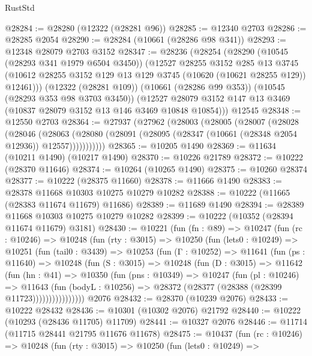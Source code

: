 \begin{lexlean}{RustStd}
\begin{coremodule}
@28284 := @28280 (@12322 (@28281 @96))
@28285 := @12340 @2703
@28286 := @28285 @2054
@28290 := @28284 (@10661 (@28286 @98 @341))
@28293 := @12348 @28079 @2703 @3152
@28347 := @28236
    (@28254
      (@28290
        (@10545 (@28293 @341 @1979 @6504 @3450))
        (@12527
          @28255
          @3152
          @285
          @13
          @3745
          (@10612 @28255 @3152 @129 @13 @129 @3745 (@10620 (@10621 @28255 @129)) @12461)))
      (@12322 (@28281 @109))
      (@10661 (@28286 @99 @353))
      (@10545 (@28293 @353 @98 @3703 @3450))
      (@12527 @28079 @3152 @147 @13 @3469 (@10837 @28079 @3152 @13 @146 @3469 @10848 @10854)))
    @12545
@28348 := @12550 @2703
@28364 := @27937
    (@27962
      (@28003
        (@28005
          (@28007
            (@28028
              (@28046
                (@28063
                  (@28080 (@28091 (@28095 (@28347 (@10661 (@28348 @2054 @12936)) @12557)))))))))))
@28365 := @10205 @1490
@28369 := @11634 (@10211 @1490) (@10217 @1490)
@28370 := @10226 @21789
@28372 := @10222 (@28370 @11646)
@28374 := @10264 (@10265 @1490)
@28375 := @10260 @28374
@28377 := @10222 (@28375 @11660)
@28378 := @11666 @1490
@28383 := @28378 @11668 @10303 @10275 @10279 @10282
@28388 := @10222 (@11665 (@28383 @11674 @11679) @11686)
@28389 := @11689 @1490
@28394 := @28389 @11668 @10303 @10275 @10279 @10282
@28399 := @10222 (@10352 (@28394 @11674 @11679) @3181)
@28430 := @10221
    (fun (fn : @89) =>
    @10247
      (fun (rc : @10246) =>
      @10248
        (fun (rty : @3015) =>
        @10250
          (fun (lets0 : @10249) =>
          @10251
            (fun (tail0 : @3439) =>
            @10253
              (fun (Γ : @10252) =>
              @11641
                (fun (ps : @11640) =>
                @10248
                  (fun (S : @3015) =>
                  @10248
                    (fun (D : @3015) =>
                    @11642
                      (fun (hn : @41) =>
                      @10350
                        (fun (pns : @10349) =>
                        @10247
                          (fun (pl : @10246) =>
                          @11643
                            (fun (bodyL : @10256) =>
                            @28372 (@28377 (@28388 (@28399 @11723))))))))))))))))
    @2076
@28432 := @28370 (@10239 @2076)
@28433 := @10222 @28432
@28436 := @10301 (@10302 @2076) @21792
@28440 := @10222 (@10293 (@28436 @11705) @11709)
@28441 := @10327 @2076
@28446 := @11714 (@11715 @28441 @21795 @11676 @11678)
@28475 := @10437
    (fun (rc : @10246) =>
    @10248
      (fun (rty : @3015) =>
      @10250
        (fun (lets0 : @10249) =>

\end{coremodule}
\end{lexlean}
